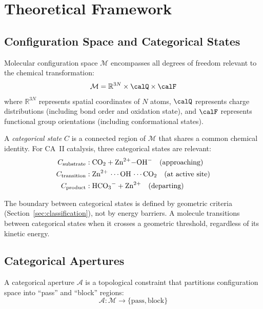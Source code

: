 \documentclass[twocolumn,amsmath,amssymb,aps,prb,superscriptaddress,longbibliography]{revtex4-2}
\newcommand{\calA}{\mathcal{A}}
\newcommand{\calM}{\mathcal{M}}
\begin{document}
\section{Theoretical Framework}
\label{sec:theory}

\subsection{Configuration Space and Categorical States}

Molecular configuration space $\calM$ encompasses all degrees of freedom relevant to the chemical transformation:
\begin{equation}
\calM = \mathbb{R}^{3N} \times \calQ \times \calF
\label{eq:config-space}
\end{equation}
where $\mathbb{R}^{3N}$ represents spatial coordinates of $N$ atoms, $\calQ$ represents charge distributions (including bond order and oxidation state), and $\calF$ represents functional group orientations (including conformational states).

A \emph{categorical state} $C$ is a connected region of $\calM$ that shares a common chemical identity. For CA~II catalysis, three categorical states are relevant:
\begin{align}
C_{\text{substrate}} &: \ce{CO2} + \ce{Zn^{2+}-OH-} \quad \text{(approaching)} \\
C_{\text{transition}} &: \ce{Zn^{2+} \cdots OH \cdots CO2} \quad \text{(at active site)} \\
C_{\text{product}} &: \ce{HCO3-} + \ce{Zn^{2+}} \quad \text{(departing)}
\end{align}

The boundary between categorical states is defined by geometric criteria (Section~\ref{sec:classification}), not by energy barriers. A molecule transitions between categorical states when it crosses a geometric threshold, regardless of its kinetic energy.

\subsection{Categorical Apertures}
\label{sec:apertures}

A categorical aperture $\calA$ is a topological constraint that partitions configuration space into ``pass'' and ``block'' regions:
\begin{equation}
\calA: \calM \to \{\text{pass}, \text{block}\}
\label{eq:aperture-def}
\end{equation}
\end{document}
